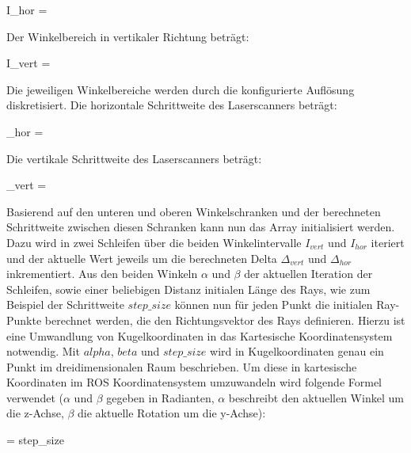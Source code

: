 \begin{myequation}
I_{hor} = 
\end{myequation}

Der Winkelbereich in vertikaler Richtung beträgt:

\begin{myequation}
I_{vert} = 
\end{myequation}

Die jeweiligen Winkelbereiche werden durch die konfigurierte Auflösung diskretisiert.
Die horizontale Schrittweite des Laserscanners beträgt:

\begin{myequation}
\Delta_{hor} = 
\end{myequation}

Die vertikale Schrittweite des Laserscanners beträgt:

\begin{myequation}
\Delta_{vert} = 
\end{myequation}

Basierend auf den unteren und oberen Winkelschranken und der berechneten Schrittweite zwischen diesen Schranken kann nun das Array initialisiert werden. Dazu wird in zwei Schleifen über die beiden Winkelintervalle $I_{vert}$ und $I_{hor}$ iteriert und der aktuelle Wert jeweils um die berechneten Delta $\Delta_{vert}$ und  $\Delta_{hor}$ inkrementiert. Aus den beiden Winkeln $\alpha$ und $\beta$ der aktuellen Iteration der Schleifen, sowie einer beliebigen Distanz initialen Länge des Rays, wie zum Beispiel der Schrittweite $step\_size$ können nun für jeden Punkt die initialen Ray-Punkte berechnet werden, die den Richtungsvektor des Rays definieren.
Hierzu ist eine Umwandlung von Kugelkoordinaten in das Kartesische Koordinatensystem notwendig. Mit $alpha$, $beta$ und $step\_size$ wird in Kugelkoordinaten genau ein Punkt im dreidimensionalen Raum beschrieben. Um diese in kartesische Koordinaten im ROS Koordinatensystem umzuwandeln wird folgende Formel verwendet ($\alpha$ und $\beta$ gegeben in Radianten, $\alpha$ beschreibt den aktuellen Winkel um die z-Achse, $\beta$ die aktuelle Rotation um die y-Achse):

\begin{myequation}
 = step\_size \cdot \colvec{\cos\left(\alpha \right) \cdot \cos\left(\beta \right) \\ \sin\left(\alpha \right) \cdot \cos\left(\beta \right) \\ \sin\left(\beta \right)}
\end{myequation}

